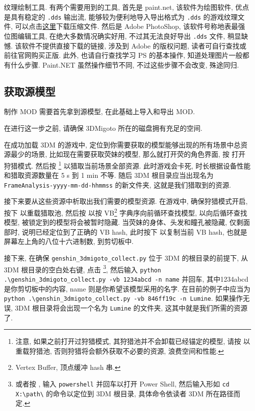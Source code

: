             \par 纹理绘制工具. 有两个需要用到的工具, 首先是 \textsf{paint.net}, 该软件为绘图软件, 优点是具有稳定的 \texttt{.dds} 输出流, 能够较为便利地导入导出格式为 \texttt{.dds} 的游戏纹理文件, 可以点击\href{https://github.com/paintdotnet/release/releases/download/v5.0.13/paint.net.5.0.13.install.anycpu.web.zip}{这里}下载压缩文件. 然后是 Adobe PhotoShop, 该软件号称地表最强位图编辑工具, 在绝大多数情况确实好用, 不过其无法良好导出 \texttt{.dds} 文件, 稍显缺憾. 该软件不提供直接下载的链接, 涉及到 Adobe 的版权问题, 读者可自行查找或前往官网购买正版. 此外, 也请自行查找学习 PS 的基本操作, 知道处理图片一般都有什么步骤. Paint.NET 虽然操作细节不同, 不过这些步骤不会改变, 殊途同归.

        \subsection{获取源模型}
            \par 制作 MOD 需要首先拿到源模型, 在此基础上导入和导出 MOD.
            \par 在进行这一步之前, 请确保 3DMigoto 所在的磁盘拥有充足的空间.
            \par 在成功加载 3DM 的游戏中, 定位到你需要获取的模型能够出现的所有场景中总资源最少的场景, 比如现在需要获取荧妹的模型, 那么就打开荧的角色界面, 按  打开狩猎模式. 然后按 \footnote{注意, 如果之前打开过狩猎模式, 其狩猎池并不会卸载已经锚定的模型, 请按  以重载狩猎池, 否则狩猎将会额外获取不必要的资源, 浪费空间和性能.} 以猎取当前场景全部资源. 此时游戏会卡死, 时长根据设备性能和猎取资源数量在 5 s 到 1 min 不等. 随后 3DM 根目录应当出现名为 \texttt{FrameAnalysis-yyyy-mm-dd-hhmmss} 的新文件夹, 这就是我们猎取到的资源.
            \par 接下来要从这些资源中析取出我们需要的模型资源. 在游戏中, 确保狩猎模式开启, 按下  以重载猎取池, 然后按  以按 VB\footnote{Vertex Buffer, 顶点缓冲 hash 串.} 字典序向前循环查找模型,  以向后循环查找模型, 被锁定到的模型将会被暂时隐藏. 当荧妹的身体、头发和瞳孔被隐藏, 仅剩面部时, 说明已经定位到了正确的 VB hash, 此时按下  以复制当前 VB hash, 也就是屏幕左上角的八位十六进制数, 到剪切板中.
            \par 接下来, 在确保 \texttt{genshin\_3dmigoto\_collect.py} 位于 3DM 的根目录的前提下, 从 3DM 根目录的空白处右键, 点击 \footnote{或者按 , 输入 \texttt{powershell} 并回车以打开 Power Shell, 然后输入形如 \texttt{cd X:\textbackslash path\textbackslash} 的命令以定位到 3DM 根目录, 具体命令依读者 3DM 所在路径而定.}, 然后输入 \texttt{python .\textbackslash genshin\_3dmigoto\_collect.py -vb 1234abcd -n name} 并回车, 其中1234abcd 是你剪切板中的内容, name 则是你希望该模型采用的名字. 在目前的例子中应当为 \texttt{python .\textbackslash genshin\_3dmigoto\_collect.py -vb 846ff19c -n Lumine}. 如果操作无误, 3DM 根目录将会出现一个名为 \texttt{Lumine} 的文件夹, 这其中就是我们所需的资源了.

